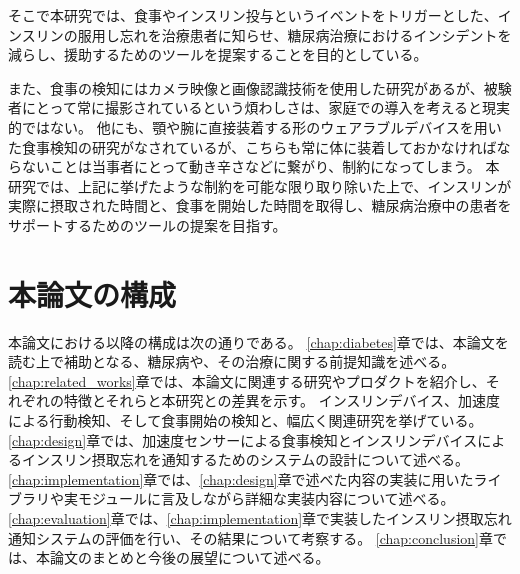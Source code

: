 そこで本研究では、食事やインスリン投与というイベントをトリガーとした、インスリンの服用し忘れを治療患者に知らせ、糖尿病治療におけるインシデントを減らし、援助するためのツールを提案することを目的としている。

また、食事の検知にはカメラ映像と画像認識技術を使用した研究があるが、被験者にとって常に撮影されているという煩わしさは、家庭での導入を考えると現実的ではない。
他にも、顎や腕に直接装着する形のウェアラブルデバイスを用いた食事検知の研究がなされているが、こちらも常に体に装着しておかなければならないことは当事者にとって動き辛さなどに繋がり、制約になってしまう。
本研究では、上記に挙げたような制約を可能な限り取り除いた上で、インスリンが実際に摂取された時間と、食事を開始した時間を取得し、糖尿病治療中の患者をサポートするためのツールの提案を目指す。

\section{本論文の構成}
\label{section:structure}
本論文における以降の構成は次の通りである。
\ref{chap:diabetes}章では、本論文を読む上で補助となる、糖尿病や、その治療に関する前提知識を述べる。
\ref{chap:related_works}章では、本論文に関連する研究やプロダクトを紹介し、それぞれの特徴とそれらと本研究との差異を示す。
インスリンデバイス、加速度による行動検知、そして食事開始の検知と、幅広く関連研究を挙げている。
\ref{chap:design}章では、加速度センサーによる食事検知とインスリンデバイスによるインスリン摂取忘れを通知するためのシステムの設計について述べる。
\ref{chap:implementation}章では、\ref{chap:design}章で述べた内容の実装に用いたライブラリや実モジュールに言及しながら詳細な実装内容について述べる。
\ref{chap:evaluation}章では、\ref{chap:implementation}章で実装したインスリン摂取忘れ通知システムの評価を行い、その結果について考察する。
\ref{chap:conclusion}章では、本論文のまとめと今後の展望について述べる。
